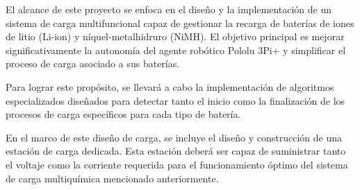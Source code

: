 El alcance de este proyecto se enfoca en el diseño y la implementación
de un sistema de carga multifuncional capaz de gestionar la recarga
de baterías de iones de litio (Li-ion) y níquel-metalhidruro (NiMH).
El objetivo principal es mejorar significativamente la autonomía del agente
robótico Pololu 3Pi+ y simplificar el proceso de carga asociado a sus baterías.

Para lograr este propósito, se llevará a cabo la implementación de algoritmos
especializados diseñados para detectar tanto el inicio como la finalización
de los procesos de carga específicos para cada tipo de batería.

En el marco de este diseño de carga, se incluye el diseño y construcción
de una estación de carga dedicada. Esta estación deberá ser capaz
de suministrar tanto el voltaje como la corriente
requerida para el funcionamiento óptimo del sistema de carga
multiquímica mencionado anteriormente.